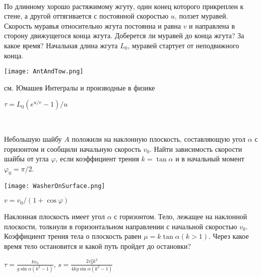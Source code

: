 \begin{ex}
\hspace{0pt} \\
\begin{minipage}{.65\textwidth}
По длинному хорошо растяжимому жгуту, один конец которого прикреплен к стене, а другой оттягивается с постоянной скоростью $u$, ползет муравей. Скорость муравья относительно жгута постоянна и равна $v$ и направлена в сторону движущегося конца жгута. Доберется ли муравей до конца жгута? За какое время? Начальная длина жгута $L_0$, муравей стартует от неподвижного конца.
\end{minipage}
\begin{minipage}{.35\textwidth}
\centering
\texttt{[image: AntAndTow.png]}
\end{minipage}
\begin{sol}
см. Юмашев Интегралы и производные в физике
\end{sol}
\begin{ans}
$\tau = L_0(e^{u/v} - 1)/u$
\end{ans}
\end{ex}

\begin{ex}
\hspace{0pt} \\
\begin{minipage}{.65\textwidth}
Небольшую шайбу $A$ положили на наклонную плоскость, составляющую угол $\alpha$ с горизонтом и сообщили начальную скорость $v_0$. Найти зависимость скорости шайбы от угла $\varphi$, если коэффициент трения $k = \tan \alpha$ и в начальный момент $\varphi_0 = \pi/2$.
\end{minipage}
\begin{minipage}{.35\textwidth}
\centering
\texttt{[image: WasherOnSurface.png]}
\end{minipage}
\begin{ans}
$v=v_0/(1+\cos \varphi)$
\end{ans}
\end{ex}

\begin{ex}
Наклонная плоскость имеет угол $\alpha$ с горизонтом. Тело, лежащее на наклонной плоскости, толкнули в горизонтальном направлении с начальной скоростью $v_0$. Коэффициент трения тела о плоскость равен $\mu = k \tan \alpha (k > 1)$. Через какое время тело остановится и какой путь пройдет до остановки?
\begin{ans}
$\tau = \frac{kv_0}{g\sin\alpha(k^2-1)}$, $s = \frac{2v_0^2k^2}{4kg\sin\alpha(k^2-1)}$
\end{ans}
\end{ex}

